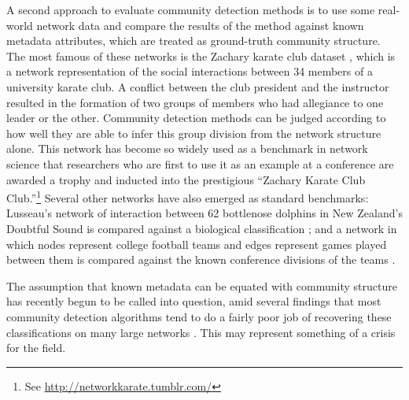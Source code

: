 A second approach to evaluate community detection methods is to use some
real-world network data and compare the results of the method against
known metadata attributes, which are treated as ground-truth community
structure. The most famous of these networks is the Zachary karate club
dataset \autocite{zachary_information_1977}, which is a network
representation of the social interactions between 34 members of a
university karate club. A conflict between the club president and the
instructor resulted in the formation of two groups of members who had
allegiance to one leader or the other. Community detection methods can
be judged according to how well they are able to infer this group
division from the network structure alone. This network has become so
widely used as a benchmark in network science that researchers who are
first to use it as an example at a conference are awarded a trophy and
inducted into the prestigious ``Zachary Karate Club Club.''\footnote{See
  \url{http://networkkarate.tumblr.com/}} Several other networks have
also emerged as standard benchmarks: Lusseau's network of interaction
between 62 bottlenose dolphins in New Zealand's Doubtful Sound is
compared against a biological classification
\autocite{lusseau_emergent_2003}; and a network in which nodes represent
college football teams and edges represent games played between them is
compared against the known conference divisions of the teams
\autocite{girvan_community_2002}.

The assumption that known metadata can be equated with community
structure has recently begun to be called into question, amid several
findings that most community detection algorithms tend to do a fairly
poor job of recovering these classifications on many large networks
\autocites{yang_defining_2015}{hric_community_2014}. This may represent
something of a crisis for the field.

